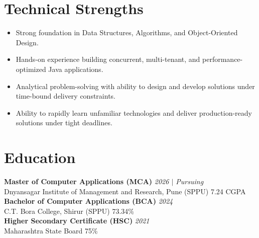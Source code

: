 \documentclass[10.5pt,a4paper]{article}
\begin{document}
\section{Technical Strengths}
\begin{itemize}
  \item Strong foundation in Data Structures, Algorithms, and Object-Oriented Design.
  \item Hands-on experience building concurrent, multi-tenant, and performance-optimized Java applications.
  \item Analytical problem-solving with ability to design and develop solutions under time-bound delivery constraints.
  \item Ability to rapidly learn unfamiliar technologies and deliver production-ready solutions under tight deadlines.
\end{itemize}
\section{Education}
\textbf{Master of Computer Applications (MCA)} \hfill \textit{2026 $|$ Pursuing}\\
Dnyansagar Institute of Management and Research, Pune (SPPU) \hfill 7.24 CGPA\\[4pt]
\textbf{Bachelor of Computer Applications (BCA)} \hfill \textit{2024}\\
C.T. Bora College, Shirur (SPPU) \hfill 73.34\%\\[4pt]
\textbf{Higher Secondary Certificate (HSC)} \hfill \textit{2021}\\
Maharashtra State Board \hfill 75\%\\[4pt]
\end{document}
